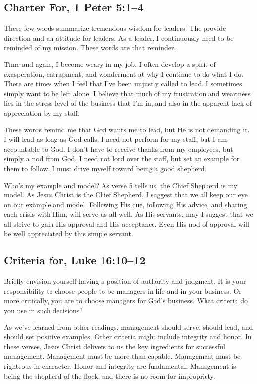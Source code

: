 \documentclass[12pt]{memoir}
\begin{document}
\subsection[Charter For]{Charter For, 1 Peter 5:1--4}

These few words summarize tremendous wisdom for leaders. The provide
direction and an attitude for leaders. As a leader, I continuously
need to be reminded of my mission. These words are that reminder. 

Time and again, I become weary in my job. I often develop a spirit
of exasperation, entrapment, and wonderment at why I continue to do
what I do. There are times when I feel that I've been unjustly called
to lead. I sometimes simply want to be left alone. I believe that
much of my frustration and weariness lies in the stress level
of the business that I'm in, and also in the apparent lack of appreciation
by my staff. 

These words remind me that God wants me to lead, but He is not demanding
it. I will lead as long as God calls. I need not perform for my staff,
but I am accountable to God. I don't have to receive thanks from my
employees, but simply a nod from God. I need not lord over the staff,
but set an example for them to follow. I must drive myself toward
being a good shepherd.

Who's my example and model? As verse 5 tells us, the Chief Shepherd
is my model. As Jesus Christ is the Chief Shepherd, I suggest that
we all keep our eye on our example and model. Following His cue, following
His advice, and sharing each crisis with Him, will serve us all well.
As His servants, may I suggest that we all strive to gain His approval
and His acceptance. Even His nod of approval will be well appreciated
by this simple servant.

\subsection[Criteria for]{Criteria for, Luke 16:10--12}

Briefly envision yourself having a position of authority and judgment.
It is your responsibility to choose people to be managers in life and in your business. Or more critically, you are to choose managers for God's business. What criteria do you use in such decisions?

As we've learned from other readings, management should serve, should
lead, and should set positive examples. Other criteria might include
integrity and honor. In these verses, Jesus Christ delivers to us
the key ingredients for successful management. Management must be
more than capable. Management must be righteous in character. Honor
and integrity are fundamental. Management is being the shepherd of
the flock, and there is no room for impropriety. 
\end{document}
